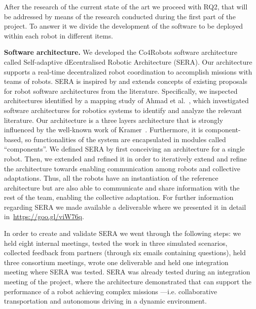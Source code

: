 After the research of the current state of the art we proceed with RQ2, that will be addressed by means of the research conducted during the first part of the project.
To answer it %
we divide the development of the software to be deployed within each robot in different items.

\textbf{Software architecture.}
We developed the Co4Robots software architecture called Self-adaptive dEcentralised Robotic Architecture (SERA).
Our architecture supports a real-time decentralized robot coordination to accomplish missions with teams of robots. 
SERA is inspired by and extends concepts of existing proposals for robot software architectures from the literature. 
Specifically, we inspected architectures identified by a mapping study of Ahmad et al.~\cite{Ahmad201616}, which investigated software architectures for robotics systems to identify and analyze the relevant literature. %
Our architecture is a three layers architecture that is strongly influenced by the well-known work of Kramer~\cite{kramer}.
Furthermore, it is component-based, %
so functionalities of the system are encapsulated in modules called ``components''.
We defined SERA by first conceiving an architecture for a single robot. 
Then, we extended and refined it in order to iteratively extend and refine the architecture towards enabling communication among robots and collective adaptations. 
Thus, all the robots have an instantiation of the reference architecture but are also able to communicate and share information with the rest of the team, enabling the collective adaptation. 
For further information regarding SERA we made available a deliverable where we presented it in detail in~\url{https://goo.gl/viW76q}.



In order to create and validate SERA we went through the following steps: %
we held eight internal meetings, tested the work in three simulated scenarios, collected feedback from partners (through six emails containing questions), held three consortium meetings, wrote one deliverable and held one integration meeting where SERA was tested.
SERA was already tested during an integration meeting of the project, where the architecture demonstrated that can support the performance of a robot achieving complex missions ---i.e. collaborative transportation and autonomous driving in a dynamic environment.

